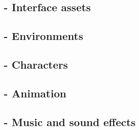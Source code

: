 \subsection{- Interface assets}
\subsection{- Environments}
\subsection{- Characters}
\subsection{- Animation}
\subsection{- Music and sound effects}
